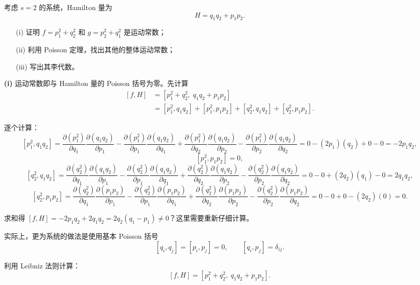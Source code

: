 \begin{question}
考虑 \(s=2\) 的系统，Hamilton 量为
\[
H = q_1q_2 + p_1p_2.
\]
\begin{itemize}
  \item[\textup{(i)}] 证明 \(f = p_1^2+q_2^2\) 和 \(g = p_2^2+q_1^2\) 是运动常数；
  \item[\textup{(ii)}] 利用 Poisson 定理，找出其他的整体运动常数；
  \item[\textup{(iii)}] 写出其李代数。
\end{itemize}
\begin{solution}
\textbf{(i)} 运动常数即与 Hamilton 量的 Poisson 括号为零。先计算
\[
\begin{aligned}
[f,H] &= [p_1^2+q_2^2,\;q_1q_2+p_1p_2] \\
&= [p_1^2,q_1q_2] + [p_1^2,p_1p_2]
+ [q_2^2,q_1q_2] + [q_2^2,p_1p_2].
\end{aligned}
\]

逐个计算：
\[
[p_1^2,q_1q_2] =
\frac{\partial(p_1^2)}{\partial q_1}\frac{\partial(q_1q_2)}{\partial p_1}
-\frac{\partial(p_1^2)}{\partial p_1}\frac{\partial(q_1q_2)}{\partial q_1}
+\frac{\partial(p_1^2)}{\partial q_2}\frac{\partial(q_1q_2)}{\partial p_2}
-\frac{\partial(p_1^2)}{\partial p_2}\frac{\partial(q_1q_2)}{\partial q_2}
= 0 - (2p_1)(q_2) + 0 - 0 = -2p_1q_2,
\]
\[
[p_1^2,p_1p_2]=0,
\]
\[
[q_2^2,q_1q_2]=
\frac{\partial(q_2^2)}{\partial q_1}\frac{\partial(q_1q_2)}{\partial p_1}
-\frac{\partial(q_2^2)}{\partial p_1}\frac{\partial(q_1q_2)}{\partial q_1}
+\frac{\partial(q_2^2)}{\partial q_2}\frac{\partial(q_1q_2)}{\partial p_2}
-\frac{\partial(q_2^2)}{\partial p_2}\frac{\partial(q_1q_2)}{\partial q_2}
= 0-0+(2q_2)(q_1)-0 = 2q_1q_2,
\]
\[
[q_2^2,p_1p_2]=
\frac{\partial(q_2^2)}{\partial q_1}\frac{\partial(p_1p_2)}{\partial p_1}
-\frac{\partial(q_2^2)}{\partial p_1}\frac{\partial(p_1p_2)}{\partial q_1}
+\frac{\partial(q_2^2)}{\partial q_2}\frac{\partial(p_1p_2)}{\partial p_2}
-\frac{\partial(q_2^2)}{\partial p_2}\frac{\partial(p_1p_2)}{\partial q_2}
=0-0+0-(2q_2)(0)=0.
\]

求和得 \([f,H]=-2p_1q_2+2q_1q_2 = 2q_2(q_1-p_1)\neq 0\)？这里需要重新仔细计算。

实际上，更为系统的做法是使用基本 Poisson 括号
\[
[q_i,q_j]=[p_i,p_j]=0,\qquad [q_i,p_j]=\delta_{ij}.
\]

利用 Leibniz 法则计算：
\[
[f,H] = [p_1^2+q_2^2,\;q_1q_2+p_1p_2].
\]


\end{solution}
\end{question}
